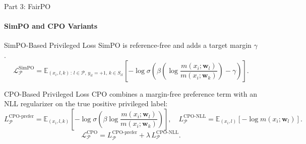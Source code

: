 \documentclass[aspectratio=169]{beamer}
\newcommand{\E}{\mathbb{E}}
\newcommand{\privileged}{\mathcal{P}} %
\newcommand{\confusing}{S_{il}} %
\newcommand{\model}{m} %
\newcommand{\params}{\mathbf{w}} %
\newcommand{\loss}{\mathcal{L}}
\begin{document}
	\begin{frame}{Part 3: FairPO}
		\framesubtitle{SimPO and CPO Variants}
		\begin{block}{\scriptsize SimPO-Based Privileged Loss}\scriptsize
			SimPO \autocite{meng2024simpo} is reference-free and adds a target margin $\gamma$.
			\begin{equation}
				\loss_{\privileged}^{\text{SimPO}} = \E_{(x_i, l, k)\,:\, l \in \privileged,\, y_{il}=+1,\, k \in \confusing} \left[ -\log \sigma \left( \beta \left( \log \frac{m(x_i;\params_l)}{m(x_i;\params_k)} \right) - \gamma \right) \right].
			\end{equation}
		\end{block}
		\begin{block}{\scriptsize CPO-Based Privileged Loss}\scriptsize
			CPO \autocite{xu2024contrastive} combines a margin-free preference term with an NLL regularizer on the true positive privileged label:
			\begin{equation}
				L_{\mathcal{P}}^{\text{CPO-prefer}} = \E_{(x_i, l, k)} \left[ -\log \sigma \left( \beta \log \frac{m(x_i;\params_l)}{m(x_i;\params_k)} \right) \right], \quad
				L_{\mathcal{P}}^{\text{CPO-NLL}} = \E_{(x_i, l)} [ -\log \model(x_i; \params_l) ].
			\end{equation}
			\begin{equation}
				\loss_{\privileged}^{\text{CPO}} = L_{\mathcal{P}}^{\text{CPO-prefer}} + \lambda\, L_{\mathcal{P}}^{\text{CPO-NLL}}.
			\end{equation}
		\end{block}
	\end{frame}
	
\end{document}
